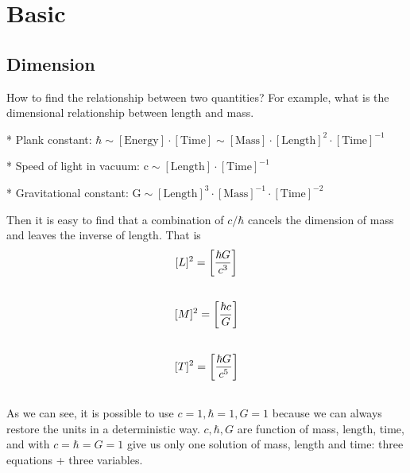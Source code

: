 \documentclass[letterpaper,10pt,english]{sphinxmanual}
\begin{document}
\section{Basic}
\label{Basic::doc}\label{Basic:basic}

\subsection{Dimension}
\label{Basic:dimension}
How to find the relationship between two quantities? For example, what is the dimensional relationship between length and mass.

\begin{DUlineblock}{0em}
\item[] * Plank constant: $\mathrm{ \hbar \sim [Energy]\cdot [Time] \sim [Mass]\cdot [Length]^2 \cdot [Time]^{-1} }$
\item[] * Speed of light in vacuum: $\mathrm{ c\sim [Length]\cdot [Time]^{-1} }$
\item[] * Gravitational constant: $\mathrm{  G \sim [Length]^3\cdot [Mass]^{-1} \cdot [Time]^{-2} }$
\end{DUlineblock}

Then it is easy to find that a combination of $c/\hbar$ cancels the dimension of mass and leaves the inverse of length. That is
\begin{gather}
\begin{split}[ L ]^2 =\left[ \frac{\hbar G}{c^3} \right]\end{split}\notag\\\begin{split}\end{split}\notag
\end{gather}\begin{gather}
\begin{split}[ M ]^2 = \left [ \frac{\hbar c}{ G } \right]\end{split}\notag\\\begin{split}\end{split}\notag
\end{gather}\begin{gather}
\begin{split}[T]^2 = \left[ \frac{ \hbar G }{ c^5 }  \right]\end{split}\notag\\\begin{split}\end{split}\notag
\end{gather}
As we can see, it is possible to use $c=1, \hbar = 1, G =1$ because we can always restore the units in a deterministic way. $c, \hbar, G$ are function of mass, length, time, and with $c = \hbar = G=1$ give us only one solution of mass, length and time: three equations + three variables.
\end{document}
